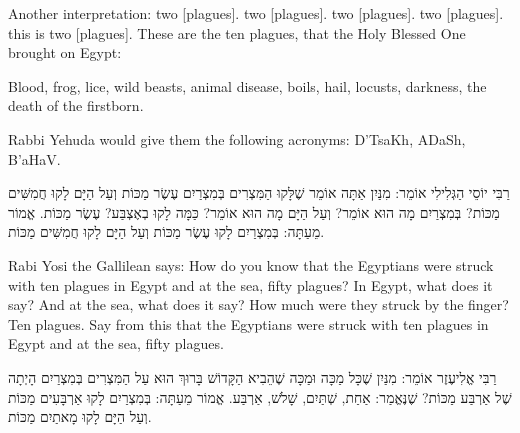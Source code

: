 \begin{english}
Another interpretation:  two [plagues].  two [plagues].  two [plagues].  two [plagues].  this is two [plagues]. These are the ten plagues, that the Holy Blessed One brought on Egypt:

Blood, frog, lice, wild beasts, animal disease, boils, hail, locusts, darkness, the death of the firstborn.

Rabbi Yehuda would give them the following acronyms: D'TsaKh, ADaSh, B'aHaV.
\end{english}

\vspace{1em}


רַבִּי יוֹסֵי הַגְּלִילִי אוֹמֵר: מִנַּיִן אַתָּה אוֹמֵר שֶׁלָּקוּ הַמִּצְרִים בְּמִצְרַיִם עֶשֶׂר מַכּוֹת וְעַל הַיָּם לָקוּ חֲמִשִּׁים מַכּוֹת? בְּמִצְרַיִם מָה הוּא אוֹמֵר?
וְעַל הַיָּם מָה הוּא אוֹמֵר?
כַּמָּה לָקוּ בְאֶצְבַּע? עֶשֶׂר מַכּוֹת. אֱמוֹר מֵעַתָּה: בְּמִצְרַיִם לָקוּ עֶשֶׂר מַכּוֹת וְעַל הַיָּם לָקוּ חֲמִשִּׁים מַכּוֹת.

\begin{english}
Rabi Yosi the Gallilean says: How do you know that the Egyptians were struck with ten plagues in Egypt and at the sea, fifty plagues? In Egypt, what does it say?  And at the sea, what does it say?  How much were they struck by the finger? Ten plagues. Say from this that the Egyptians were struck with ten plagues in Egypt and at the sea, fifty plagues.
\end{english}

\vspace{1em}

רַבִּי אֱלִיעֶזֶר אוֹמֵר: מִנַּיִן שֶׁכָּל מַכָּה וּמַכָּה שֶׁהֵבִיא הַקָּדוֹשׁ בָּרוּךְ הוּא עַל הַמִּצְרִים בְּמִצְרַיִם הָיְתָה שֶׁל אַרְבַּע מַכּוֹת? שֶׁנֶּאֱמַר:
אַחַת,
שְׁתַּיִם,
שָׁלשׁ,
אַרְבַּע. אֱמוֹר מֵעַתָּה: בְּמִצְרַיִם לָקוּ אַרְבָּעִים מַכּוֹת וְעַל הַיָּם לָקוּ מָאתַיִם מַכּוֹת.

